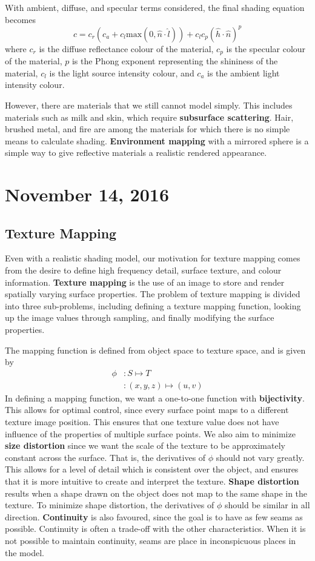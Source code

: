 \documentclass[11pt]{article}
\theoremstyle{plain} %
\theoremstyle{definition}
\theoremstyle{example}
\theoremstyle{remark}
\begin{document}
With ambient, diffuse, and specular terms considered, the final shading equation becomes 
$$c = c_r\left(c_a + c_l\text{max}\left(0, \hat{n} \cdot \hat{l}\right)\right) + c_lc_p\left(\hat{h} \cdot \hat{n}\right)^p$$
where $c_r$ is the diffuse reflectance colour of the material, $c_p$ is the specular colour of the material, $p$ is the Phong exponent representing the shininess of the material, $c_l$ is the light source intensity colour, and $c_a$ is the ambient light intensity colour.

However, there are materials that we still cannot model simply. This includes materials such as milk and skin, which require \textbf{subsurface scattering}. Hair, brushed metal, and fire are among the materials for which there is no simple means to calculate shading. \textbf{Environment mapping} with a mirrored sphere is a simple way to give reflective materials a realistic rendered appearance. 

\section{November 14, 2016}
\subsection{Texture Mapping}

Even with a realistic shading model, our motivation for texture mapping comes from the desire to define high frequency detail, surface texture, and colour information. \textbf{Texture mapping} is the use of an image to store and render spatially varying surface properties. The problem of texture mapping is divided into three sub-problems, including defining a texture mapping function, looking up the image values through sampling, and finally modifying the surface properties. 

The mapping function is defined from object space to texture space, and is given by 
\begin{align*}
\phi &:S \mapsto T\\
&:(x,y,z) \mapsto (u,v)
\end{align*}
In defining a mapping function, we want a one-to-one function with \textbf{bijectivity}. This allows for optimal control, since every surface point maps to a different texture image position. This ensures that one texture value does not have influence of the properties of multiple surface points. We also aim to minimize \textbf{size distortion} since we want the scale of the texture to be approximately constant across the surface. That is, the derivatives of $\phi$ should not vary greatly. This allows for a level of detail which is consistent over the object, and ensures that it is more intuitive to create and interpret the texture. \textbf{Shape distortion} results when a shape drawn on the object does not map to the same shape in the texture. To minimize shape distortion, the derivatives of $\phi$ should be similar in all direction. \textbf{Continuity} is also favoured, since the goal is to have as few seams as possible. Continuity is often a trade-off with the other characteristics. When it is not possible to maintain continuity, seams are place in inconspicuous places in the model. 
\end{document}
